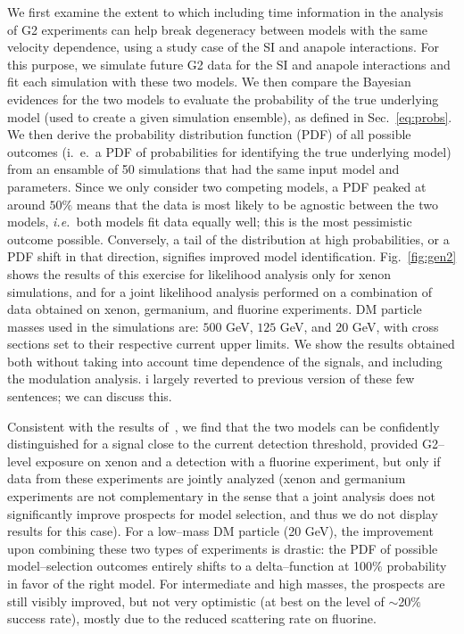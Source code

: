 \documentclass[11pt]{article}
\newcommand{\ie}{{\it i.e.~}}  \newcommand{\eg}{{\it e.g.~}}
\newcommand{\Sec}[1]{Sec.~\ref{#1}} \newcommand{\Secs}[2]{Secs.~\ref{#1} and \ref{#2}} \newcommand{\Secm}[2]{Secs.~\ref{#1} through \ref{#2}}
\newcommand{\Fig}[1]{Fig.~\ref{#1}} \newcommand{\Figs}[2]{Figs.~\ref{#1} and \ref{#2}}
\newcommand{\vgColor}{magenta}
\newcommand{\vg}[1]{{\color{\vgColor} #1}}
\begin{document}
We first examine the extent to which including time information in the analysis of G2 experiments can help break degeneracy between models with the same velocity dependence, using a study case of the SI and anapole interactions. For this purpose, we simulate future G2 data for the SI and anapole interactions and fit each simulation with these two models. We then compare the Bayesian evidences for the two models to evaluate the probability of the true underlying model (used to create a given simulation ensemble), as defined in \Sec{eq:probs}. We then derive the probability distribution function (PDF) of all possible outcomes (i.~e.~a PDF of probabilities for identifying the true underlying model) from an ensamble of 50 simulations that had the same input model and parameters. Since we only consider two competing models, a PDF peaked at around $50\%$ means that the data is most likely to be agnostic between the two models, \ie both models fit data equally well; this is the most pessimistic outcome possible. Conversely, a tail of the distribution at high probabilities, or a PDF shift in that direction, signifies improved model identification. \Fig{fig:gen2} shows the results of this exercise for likelihood analysis only for xenon simulations, and for a joint likelihood analysis performed on a combination of data obtained on xenon, germanium, and fluorine experiments.  DM particle masses used in the simulations are: $500$ GeV, $125$ GeV, and $20$ GeV, with cross sections set to their respective current upper limits. We show the results obtained both without taking into account time dependence of the signals, and including the modulation analysis. \vg{i largely reverted to previous version of these few sentences; we can discuss this.}

Consistent with the results of~\cite{Gluscevic:2015sqa}, we find that the two models can be confidently distinguished for a signal close to the current detection threshold, provided G2--level exposure on xenon and a detection with a fluorine experiment, but only if data from these experiments are jointly analyzed (xenon and germanium experiments are not complementary in the sense that a joint analysis does not significantly improve prospects for model selection, and thus we do not display results for this case). For a low--mass DM particle (20 GeV), the improvement upon combining these two types of experiments is drastic: the PDF of possible model--selection outcomes entirely shifts to a delta--function at 100$\%$ probability in favor of the right model. For intermediate and high masses, the prospects are still visibly improved, but not very optimistic (at best on the level of $\sim$20$\%$ success rate), mostly due to the reduced scattering rate on fluorine.  
\end{document}
